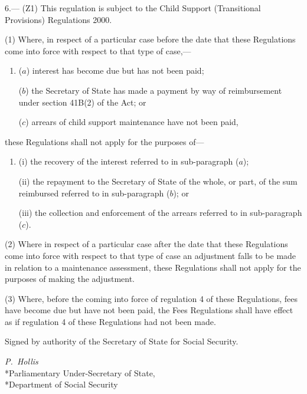 \documentclass[12pt,a4paper]{article}
\begin{document}
6.---%
(Z1) This regulation is subject to the Child Support (Transitional Provisions) Regulations 2000.

(1)  Where, in respect of a particular case before the date that these Regulations come into force with respect to that type of case,—
\begin{enumerate}\item[]
($a$) interest has become due but has not been paid;

($b$) the Secretary of State has made a payment by way of reimbursement under section 41B(2) of the Act; or

($c$) arrears of child support maintenance have not been paid,
\end{enumerate}
these Regulations shall not apply for the purposes of—
\begin{enumerate}\item[]
(i) the recovery of the interest referred to in sub-paragraph ($a$);

(ii) the repayment to the Secretary of State of the whole, or part, of the sum reimbursed referred to in sub-paragraph ($b$); or

(iii) the collection and enforcement of the arrears referred to in sub-paragraph ($c$).
\end{enumerate}

(2) Where in respect of a particular case after the date that these Regulations come into force with respect to that type of case an adjustment falls to be made in relation to a maintenance assessment, these Regulations shall not apply for the purposes of making the adjustment.

(3) Where, before the coming into force of regulation 4 of these Regulations, fees have become due but have not been paid, the Fees Regulations shall have effect as if regulation 4 of these Regulations had not been made. 


\bigskip

Signed 
by authority of the Secretary of State for Social Security.

{\raggedleft
\emph{P.~Hollis}\\*Parliamentary Under-Secretary of State,\\*Department of Social Security

}
\end{document}

